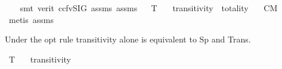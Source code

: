\begin{isabellebody}
%
\isadelimproof
\ \ %
\endisadelimproof
%
\isatagproof
{}\isamarkupfalse%
\ {\isacharparenleft}{\kern0pt}smt\ {\isacharparenleft}{\kern0pt}verit{\isacharcomma}{\kern0pt}\ ccfv{\isacharunderscore}{\kern0pt}SIG{\isacharparenright}{\kern0pt}\ assms{\isacharparenleft}{\kern0pt}{}{\isacharparenright}{\kern0pt}\ assms{\isacharparenleft}{\kern0pt}{}{\isacharparenright}{\kern0pt}{\isacharparenright}{\kern0pt}%
\endisatagproof
{\isafoldproof}%
%
\isadelimproof
\ \isanewline
%
\endisadelimproof
\isanewline
{}\isamarkupfalse%
\ T{}{}{\isacharcolon}{\kern0pt}\isanewline
\ \ \ transitivity\ \ totality\isanewline
\ \ \ CM{\isacharprime}{\kern0pt}{\isacharprime}{\kern0pt}{\isacharcolon}{\kern0pt}\ {\isachardoublequoteopen}{\isasymlfloor}{\isacharparenleft}{\kern0pt}{\isasymcirc}{\isacharless}{\kern0pt}{\isasympsi}{\isacharbar}{\kern0pt}{\isasymphi}{\isachargreater}{\kern0pt}\isactrlbold {\isasymand}{\isasymcirc}{\isacharless}{\kern0pt}{\isasymchi}{\isacharbar}{\kern0pt}{\isasymphi}{\isachargreater}{\kern0pt}{\isacharparenright}{\kern0pt}\isactrlbold {\isasymrightarrow}\ {\isasymcirc}{\isacharless}{\kern0pt}{\isasymchi}{\isacharbar}{\kern0pt}{\isasymphi}\isactrlbold {\isasymand}{\isasympsi}{\isachargreater}{\kern0pt}{\isasymrfloor}{\isachardoublequoteclose}\ \isanewline
%
\isadelimproof
\ \ %
\endisadelimproof
%
\isatagproof
{}\isamarkupfalse%
\ {\isacharparenleft}{\kern0pt}metis\ assms{\isacharparenright}{\kern0pt}%
\endisatagproof
{\isafoldproof}%
%
\isadelimproof
%
\endisadelimproof
%
\begin{isamarkuptext}%
Under the opt rule transitivity alone is equivalent to Sp and Trans.%
\end{isamarkuptext}\isamarkuptrue%
\isamarkupfalse%
\ T{}{}{\isacharcolon}{\kern0pt}\isanewline
\ \ \ transitivity\ \isanewline
\ \ \ {\isachardoublequoteopen}{\isasymlfloor}{\isacharparenleft}{\kern0pt}{\isasymP}{\isacharless}{\kern0pt}{\isasympsi}{\isacharbar}{\kern0pt}{\isasymphi}{\isachargreater}{\kern0pt}\ \isactrlbold {\isasymand}\ {\isasymodot}{\isacharless}{\kern0pt}{\isacharparenleft}{\kern0pt}{\isasympsi}\isactrlbold {\isasymrightarrow}{\isasymchi}{\isacharparenright}{\kern0pt}{\isacharbar}{\kern0pt}{\isasymphi}{\isachargreater}{\kern0pt}{\isacharparenright}{\kern0pt}\ \isactrlbold {\isasymrightarrow}\ {\isasymodot}{\isacharless}{\kern0pt}{\isasymchi}{\isacharbar}{\kern0pt}{\isacharparenleft}{\kern0pt}{\isasymphi}\isactrlbold {\isasymand}{\isasympsi}{\isacharparenright}{\kern0pt}{\isachargreater}{\kern0pt}{\isasymrfloor}{\isachardoublequoteclose}\ \ \ \isanewline

\end{isabellebody}
